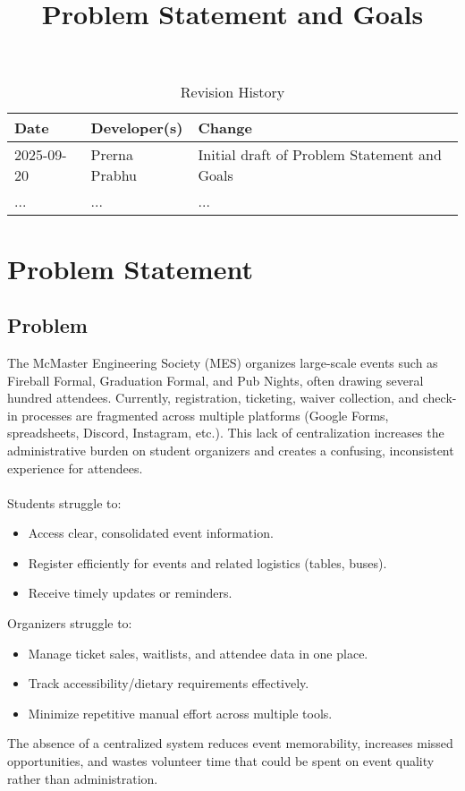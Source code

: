 \documentclass{article}
\title{Problem Statement and Goals\\\progname}
\author{\authname}
\date{}
\begin{document}
\sloppy

\maketitle

\begin{table}[hp]
\caption{Revision History} \label{TblRevisionHistory}
\begin{tabularx}{\textwidth}{llX}
\toprule
\textbf{Date} & \textbf{Developer(s)} & \textbf{Change}\\
\midrule
2025-09-20 & Prerna Prabhu  & Initial draft of Problem Statement and Goals\\
... & ... & ...\\
\bottomrule
\end{tabularx}
\end{table}

\section{Problem Statement}

\subsection{Problem}
The McMaster Engineering Society (MES) organizes large-scale events such as Fireball Formal, Graduation Formal,
 and Pub Nights, often drawing several hundred attendees. Currently, registration, ticketing, waiver collection,
 and check-in processes are fragmented across multiple platforms (Google Forms, spreadsheets, Discord, Instagram,
 etc.). This lack of centralization increases the administrative burden on student organizers and creates a
 confusing, inconsistent experience for attendees.
\\
\\Students struggle to:
\begin{itemize}
    \item Access clear, consolidated event information.
    \item Register efficiently for events and related logistics (tables, buses).
    \item Receive timely updates or reminders.
\end{itemize}
Organizers struggle to:
\begin{itemize}
    \item Manage ticket sales, waitlists, and attendee data in one place.
    \item Track accessibility/dietary requirements effectively.
    \item Minimize repetitive manual effort across multiple tools.
\end{itemize}
The absence of a centralized system reduces event memorability, increases missed opportunities, and 
wastes volunteer time that could be spent on event quality rather than administration.
\end{document}
